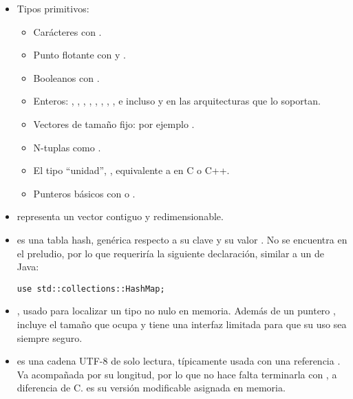 \begin{itemize}
    \item Tipos primitivos:
        \begin{itemize}
            \item Carácteres con .

            \item Punto flotante con  y .

            \item Booleanos con .

            \item Enteros: , , , ,
                , , , , e incluso
                 y  en las arquitecturas que lo soportan.

            \item Vectores de tamaño fijo: por ejemplo \rust{[1, 2, 3, 4, 5]}.

            \item N-tuplas como .

            \item El tipo ``unidad'', \rust{()}, equivalente a  en C
                o C++.

            \item Punteros básicos con  o .

        \end{itemize}

    \item {} representa un vector contiguo y redimensionable.

    \item {} es una tabla hash, genérica respecto a su clave
         y su valor . No se encuentra en el preludio, por lo que
        requeriría la siguiente declaración, similar a un  de Java:

\begin{verbatim}
use std::collections::HashMap;
\end{verbatim}

    \item {}, usado para localizar un tipo  no nulo en
        memoria. Además de un puntero , incluye el tamaño que
        ocupa  y tiene una interfaz limitada para que su uso sea siempre
        seguro.

    \item {} es una cadena UTF-8 de solo lectura, típicamente usada con
        una referencia . Va acompañada por su longitud, por lo que no
        hace falta terminarla con \code{\0}, a diferencia de C.  es
        su versión modificable asignada en memoria.

\end{itemize}

